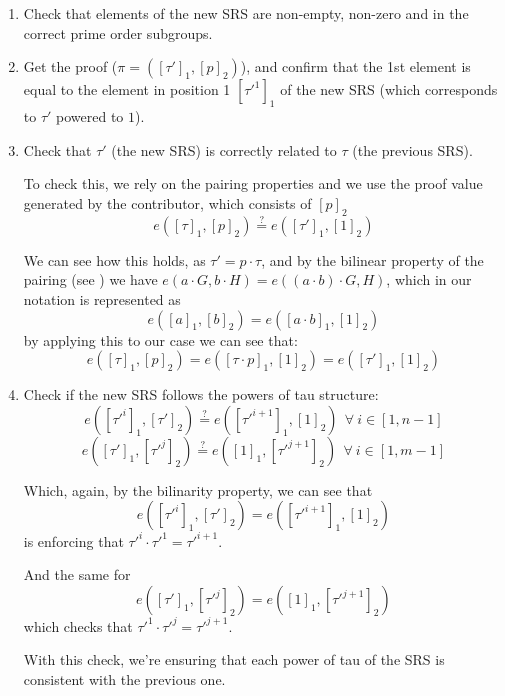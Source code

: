 \documentclass{article}
\begin{document}
\begin{enumerate}
        \item Check that elements of the new SRS are non-empty, non-zero and in the correct prime order subgroups.
\item Get the proof ($\pi = ([\tau']_1, [p]_2)$), and confirm that the 1st element is equal to the element in position 1 $[\tau'^1]_1$ of the new SRS (which corresponds to $\tau'$ powered to $1$).

\item Check that $\tau'$ (the new SRS) is correctly related to $\tau$ (the previous SRS).

    To check this, we rely on the pairing properties and we use the proof value generated by the contributor, which consists of $[p]_2$
    $$e([\tau]_1, [p]_2) \stackrel{?}{=} e([\tau']_1, [1]_2)$$
    
    We can see how this holds, as $\tau' = p \cdot \tau$, and by the bilinear property of the pairing (see \cite{pairings}) we have $e(a \cdot G, b \cdot H) = e((a \cdot b) \cdot G, H)$, which in our notation is represented as
    $$e([a]_1, [b]_2) = e([a \cdot b]_1, [1]_2)$$
    by applying this to our case we can see that:
    $$e([\tau]_1, [p]_2) = e([\tau \cdot p]_1, [1]_2) = e([\tau']_1, [1]_2)$$

\item Check if the new SRS follows the powers of tau structure:
    $$e([\tau'^i]_1, [\tau']_2) \stackrel{?}{=} e([\tau'^{i+1}]_1, [1]_2) ~~ \forall ~i \in [1, n-1]$$
    $$e([\tau']_1, [\tau'^j]_2) \stackrel{?}{=} e([1]_1, [\tau'^{j+1}]_2) ~~ \forall ~i \in [1, m-1]$$
    
    Which, again, by the bilinarity property, we can see that
    $$e([\tau'^i]_1, [\tau']_2) = e([\tau'^{i+1}]_1, [1]_2)$$
    is enforcing that $\tau'^i \cdot \tau'^1 = \tau'^{i+1}$.
    
    And the same for
    $$e([\tau']_1, [\tau'^j]_2) = e([1]_1, [\tau'^{j+1}]_2)$$
    which checks that $\tau'^1 \cdot \tau'^j = \tau'^{j+1}$.
    
    With this check, we're ensuring that each power of tau of the SRS is consistent with the previous one.
\end{enumerate}





\end{document}
